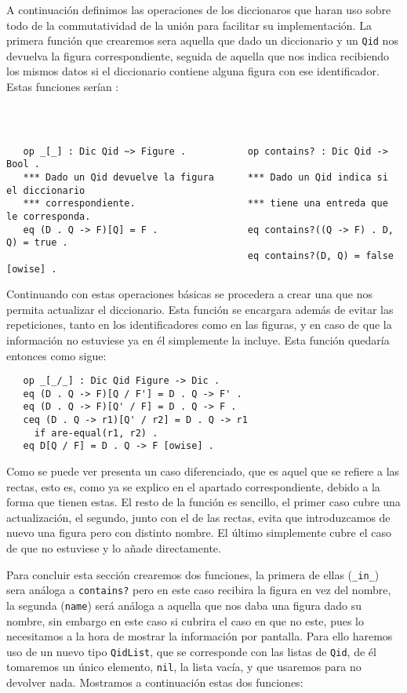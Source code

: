 A continuación definimos las operaciones de los diccionaros que haran uso sobre todo de la commutatividad de la unión para facilitar su implementación. La primera función que crearemos sera aquella que dado un diccionario y un \texttt{Qid} nos devuelva la figura correspondiente, seguida de aquella que nos indica recibiendo los mismos datos si el diccionario contiene alguna figura con ese identificador. Estas funciones serían :
{\codesize
\begin{verbatim}



   op _[_] : Dic Qid ~> Figure .           op contains? : Dic Qid -> Bool .
   *** Dado un Qid devuelve la figura      *** Dado un Qid indica si el diccionario
   *** correspondiente.                    *** tiene una entreda que le corresponda.
   eq (D . Q -> F)[Q] = F .                eq contains?((Q -> F) . D, Q) = true .
                                           eq contains?(D, Q) = false [owise] .

\end{verbatim}
}

Continuando con estas operaciones básicas se procedera a crear una que nos permita actualizar el diccionario. Esta función se encargara además de evitar las repeticiones, tanto en los identificadores como en las figuras, y en caso de que la información no estuviese ya en él simplemente la incluye. Esta función quedaría entonces como sigue:

{\codesize
\begin{verbatim}
   op _[_/_] : Dic Qid Figure -> Dic .
   eq (D . Q -> F)[Q / F'] = D . Q -> F' .
   eq (D . Q -> F)[Q' / F] = D . Q -> F .
   ceq (D . Q -> r1)[Q' / r2] = D . Q -> r1
     if are-equal(r1, r2) .   
   eq D[Q / F] = D . Q -> F [owise] .
\end{verbatim}
}

Como se puede ver presenta un caso diferenciado, que es aquel que se refiere a las rectas, esto es, como ya se explico en el apartado correspondiente, debido a la forma que tienen  estas. El resto de la función es sencillo, el primer caso cubre una actualización, el segundo, junto con el de las rectas, evita que introduzcamos de nuevo una figura pero con distinto nombre. El último simplemente cubre el caso de que no estuviese y lo añade directamente.\par

Para concluir esta sección crearemos dos funciones, la primera de ellas (\verb"_in_") sera análoga a \verb"contains?" pero en este caso recibira la figura en vez del nombre, la segunda (\verb"name") será análoga a aquella que nos daba una figura dado su nombre, sin embargo en este caso si cubrira el caso en que no este, pues lo necesitamos a la hora de mostrar la información por pantalla. Para ello haremos uso de un nuevo tipo \verb"QidList", que se corresponde con las listas de \verb"Qid", de él tomaremos un único elemento, \verb"nil", la lista vacía, y que usaremos para no devolver nada. Mostramos a continuación estas dos funciones:\par 

